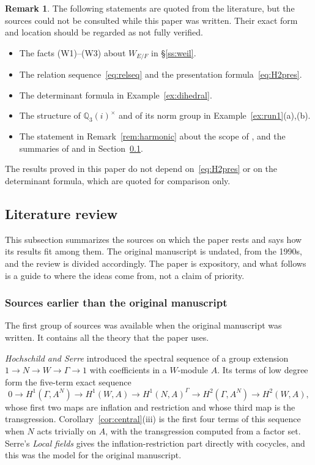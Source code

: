 \documentclass[12pt,letterpaper]{article}
\numberwithin{equation}{section}
\theoremstyle{plain}
\theoremstyle{definition}
\newtheorem{yremark}{Remark}
\newcommand{\Q}{\mathbb{Q}}
\begin{document}
\begin{yremark}\label{yrem:unverified}
The following statements are quoted from the literature, but the sources
could not be consulted while this paper was written. Their exact form and
location should be regarded as not fully verified.
\begin{itemize}[itemsep=1pt]
\item The facts (W1)--(W3) about $W_{E/F}$ in \S\ref{ss:weil}.
\item The relation sequence~\eqref{eq:relseq} and the presentation
formula~\eqref{eq:H2pres}.
\item The determinant formula in Example~\ref{ex:dihedral}.
\item The structure of $\Q_3(i)^\times$ and of its norm group in
Example~\ref{ex:run1}(a),(b).
\item The statement in Remark~\ref{rem:harmonic} about the scope of
\cite{BN09}, and the summaries of \cite{Bo93} and \cite{FSS98} in
Section~\ref{sec:literature}.
\end{itemize}
The results proved in this paper do not depend on~\eqref{eq:H2pres} or on
the determinant formula, which are quoted for comparison only.
\end{yremark}

\subsection{Literature review}\label{sec:literature}

This subsection summarizes the sources on which the paper rests and says how
its results fit among them. The original manuscript is undated, from the
1990s, and the review is divided accordingly. The paper is expository,
and what follows is a guide to where the ideas come from, not a claim of
priority.

\subsubsection{Sources earlier than the original manuscript}

The first group of sources was available when the original manuscript was
written. It contains all the theory that the paper uses.

\emph{Hochschild and Serre \cite{HS53}} introduced the spectral sequence
of a group extension $1\to N\to W\to\Gamma\to1$ with coefficients in a
$W$-module $A$. Its terms of low degree form the five-term exact sequence
\[
0\to H^1(\Gamma,A^N)\to H^1(W,A)\to H^1(N,A)^\Gamma\to H^2(\Gamma,A^N)
\to H^2(W,A),
\]
whose first two maps are inflation and restriction and whose third map is
the transgression. Corollary~\ref{cor:central}(iii) is the first four
terms of this sequence when $N$ acts trivially on $A$, with the
transgression computed from a factor set. Serre's \emph{Local fields}
\cite[Ch.~VII, \S6]{Se79} gives the inflation-restriction part directly
with cocycles, and this was the model for the original manuscript.
\end{document}
